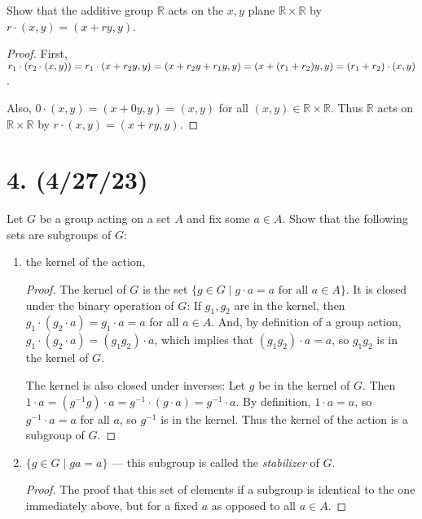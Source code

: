 \documentclass{article}
\begin{document}
Show that the additive group $\mathbb{R}$ acts on the $x, y$ plane $\mathbb{R} \times \mathbb{R}$ by $r \cdot (x, y) = (x + ry, y)$.

\begin{proof}
    First, $r_1 \cdot (r_2 \cdot (x, y)) = r_1 \cdot (x + r_2 y, y) = (x + r_2 y + r_1 y, y) = \\ (x + (r_1 + r_2)y, y) = (r_1 + r_2) \cdot (x, y)$.

    Also, $0 \cdot (x, y) = (x + 0y, y) = (x, y)$ for all $(x, y) \in \mathbb{R} \times \mathbb{R}$. Thus $\mathbb{R}$ acts on $\mathbb{R} \times \mathbb{R}$ by $r \cdot (x, y) = (x + ry, y)$.
\end{proof}

\section*{4. (4/27/23)}

Let $G$ be a group acting on a set $A$ and fix some $a \in A$. Show that the following sets are subgroups of $G$:

\begin{enumerate}[label=(\alph*)]
    \item the kernel of the action,
          \begin{proof}
            The kernel of $G$ is the set $\{ g \in G \mid g \cdot a = a \text{ for all } a \in A \}$. It is closed under the binary operation of $G$: If $g_1, g_2$ are in the kernel, then $g_1 \cdot (g_2 \cdot a) = g_1 \cdot a = a$ for all $a \in A$. And, by definition of a group action, $g_1 \cdot (g_2 \cdot a) = (g_1 g_2) \cdot a$, which implies that $(g_1 g_2) \cdot a = a$, so $g_1 g_2$ is in the kernel of $G$.

            The kernel is also closed under inverses: Let $g$ be in the kernel of $G$. Then $1 \cdot a = (g^{-1} g) \cdot a = g^{-1} \cdot (g \cdot a) = g^{-1} \cdot a$. By definition, $1 \cdot a = a$, so $g^{-1} \cdot a = a$ for all $a$, so $g^{-1}$ is in the kernel. Thus the kernel of the action is a subgroup of $G$.
          \end{proof}
    \item $\{ g \in G \mid ga = a \}$ — this subgroup is called the \emph{stabilizer} of $G$.
          \begin{proof}
            The proof that this set of elements if a subgroup is identical to the one immediately above, but for a fixed $a$ as opposed to all $a \in A$.
          \end{proof}
\end{enumerate}
\end{document}

